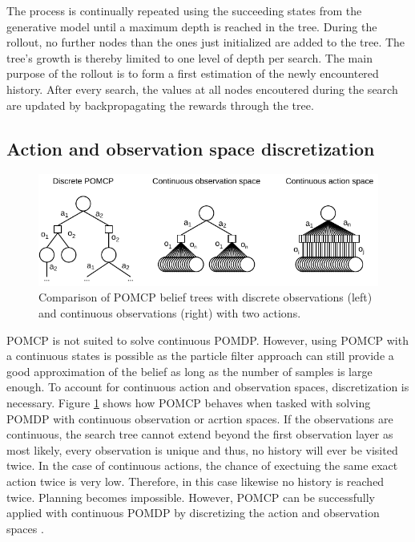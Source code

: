 



The process is continually repeated using the succeeding states from the generative model until a maximum depth is reached in the tree. During the rollout, no further nodes than the ones just initialized are added to the tree. The tree's growth is thereby limited to one level of depth per search. The main purpose of the rollout is to form a first estimation of the newly encountered history. After every search, the values at all nodes encoutered during the search are updated by backpropagating the rewards through the tree.

\subsection{Action and observation space discretization}
\label{sec:discretization}

\begin{figure}[htbp]
    \centering
    \includegraphics[width=1.0\textwidth]{figures/pomcp_continuous.pdf}
    \caption[Comparison of POMCP belief trees with discrete observations and continuous observations]{Comparison of POMCP belief trees with discrete observations (left) and continuous observations (right) with two actions.}
    \label{fig:pomcp_cont}
\end{figure}

POMCP is not suited to solve continuous POMDP. However, using POMCP with a continuous states is possible as the particle filter approach can still provide a good approximation of the belief as long as the number of samples is large enough. To account for continuous action and observation spaces, discretization is necessary. Figure \ref{fig:pomcp_cont} shows how POMCP behaves when tasked with solving POMDP with continuous observation or acrtion spaces. If the observations are continuous, the search tree cannot extend beyond the first observation layer as most likely, every observation is unique and thus, no history will ever be visited twice. In the case of continuous actions, the chance of exectuing the same exact action twice is very low. Therefore, in this case likewise no history is reached twice. Planning becomes impossible. However, POMCP can be successfully applied with continuous POMDP by discretizing the action and observation spaces \parencite{pomcp_continuous}.

